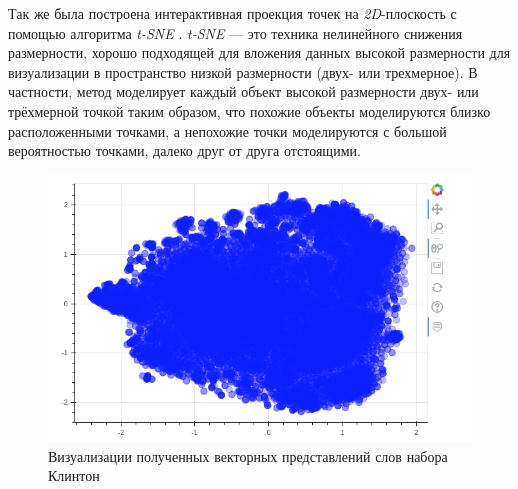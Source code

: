 Так же была построена интерактивная проекция точек на \textit{2D}-плоскость с помощью алгоритма \textit{t-SNE} \cite{bib7}. \textit{t-SNE} --- это техника нелинейного снижения размерности, хорошо подходящей для вложения данных высокой размерности для визуализации в пространство низкой размерности (двух- или трехмерное). В частности, метод моделирует каждый объект высокой размерности двух- или трёхмерной точкой таким образом, что похожие объекты моделируются близко расположенными точками, а непохожие точки моделируются с большой вероятностью точками, далеко друг от друга отстоящими.


\begin{figure}[H]
\centering
\includegraphics[scale=0.75]{pics/points.png}
\caption{Визуализации полученных векторных представлений слов набора Клинтон}
\end{figure}




